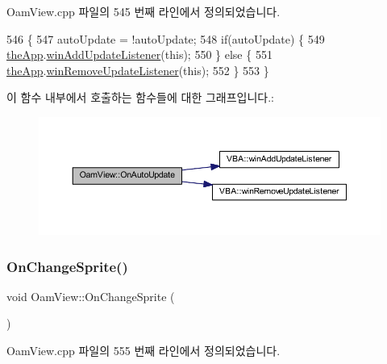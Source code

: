 Oam\+View.\+cpp 파일의 545 번째 라인에서 정의되었습니다.


\begin{DoxyCode}
546 \{
547   autoUpdate = !autoUpdate;
548   \textcolor{keywordflow}{if}(autoUpdate) \{
549     \mbox{\hyperlink{_v_b_a_8cpp_a8095a9d06b37a7efe3723f3218ad8fb3}{theApp}}.\mbox{\hyperlink{class_v_b_a_af0712f70a90d023ab8327a366be08174}{winAddUpdateListener}}(\textcolor{keyword}{this});
550   \} \textcolor{keywordflow}{else} \{
551     \mbox{\hyperlink{_v_b_a_8cpp_a8095a9d06b37a7efe3723f3218ad8fb3}{theApp}}.\mbox{\hyperlink{class_v_b_a_a2d31a0656df2230310aa8dc9e3a735d3}{winRemoveUpdateListener}}(\textcolor{keyword}{this});    
552   \}  
553 \}
\end{DoxyCode}
이 함수 내부에서 호출하는 함수들에 대한 그래프입니다.\+:
\nopagebreak
\begin{figure}[H]
\begin{center}
\leavevmode
\includegraphics[width=350pt]{class_oam_view_a5c3407e6ff2ffc673ea913d19883a4c8_cgraph}
\end{center}
\end{figure}
\mbox{\label{class_oam_view_abe95dd5fc8a624b1ae5b3e4f4deb304a}} 
\subsubsection{\texorpdfstring{On\+Change\+Sprite()}{OnChangeSprite()}}
{\footnotesize\ttfamily void Oam\+View\+::\+On\+Change\+Sprite (\begin{DoxyParamCaption}{ }\end{DoxyParamCaption})\hspace{0.3cm}{\ttfamily [protected]}}



Oam\+View.\+cpp 파일의 555 번째 라인에서 정의되었습니다.


